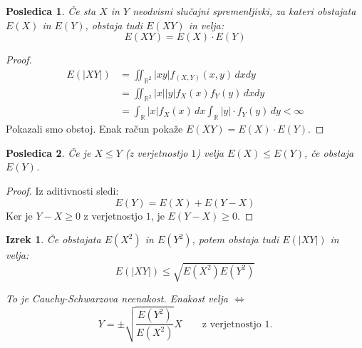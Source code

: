 \documentclass[12pt]{book}
\def\n{\noindent}
\theoremstyle{definition}
\theoremstyle{plain}
\newtheorem{izrek}{Izrek}
\theoremstyle{plain}
\theoremstyle{plain}
\newtheorem{posledica}{Posledica}
\theoremstyle{remark}
\begin{document}
\begin{posledica}
    Če sta $X$ in $Y$ neodvisni slučajni spremenljivki, za kateri obstajata $E(X)$ in $E(Y)$, obstaja tudi $E(XY)$ in velja: 
    $$
    E(X Y)=E(X) \cdot E(Y)
    $$
\end{posledica}

\begin{proof}
    $$
    \begin{aligned}
        E(|X Y|)&=\iint_{\mathbb{R}^2}|x y| f_{(X, Y)}(x, y) \, d x d y \\
        &=\iint_{\mathbb{R}^2}|x| |y| f_X(x) f_Y(y) \,d x d y \\
        &=\int_{\mathbb{R}}|x|  f_X(x) \, d x  \int_{\mathbb{R}}|y| \cdot f_Y(y) \,d y<\infty
    \end{aligned}
    $$
    Pokazali smo obstoj. Enak račun pokaže $E(X Y)=E(X) \cdot E(Y)$.
\end{proof}

\begin{posledica}
    Če je $X \leq Y$ (z verjetnostjo $1$) velja $E(X) \leq E(Y)$, če obstaja $E(Y)$.
\end{posledica}

\begin{proof}
    Iz aditivnosti sledi: 
    $$
    E(Y)=E(X)+E(Y-X)
    $$
    Ker je $Y-X \geq 0$ z verjetnostjo $1$, je $E(Y-X) \geq 0$.
\end{proof}

\begin{izrek}
    Če obstajata $E\left(X^2\right)$ in $E\left(Y^2\right)$, potem obstaja tudi $E(|X Y|)$ in velja: 
    $$
    E(|X Y|) \leq \sqrt{E\left(X^2\right) E\left(Y^2\right)}
    $$
    
    \n To je Cauchy-Schwarzova neenakost. Enakost velja $\iff$ 
    $$
    Y=\pm \sqrt{\frac{E\left(Y^2\right)}{E\left(X^2\right)}} X \qquad \text{z verjetnostjo $1$.}
    $$ 
\end{izrek}
\end{document}
